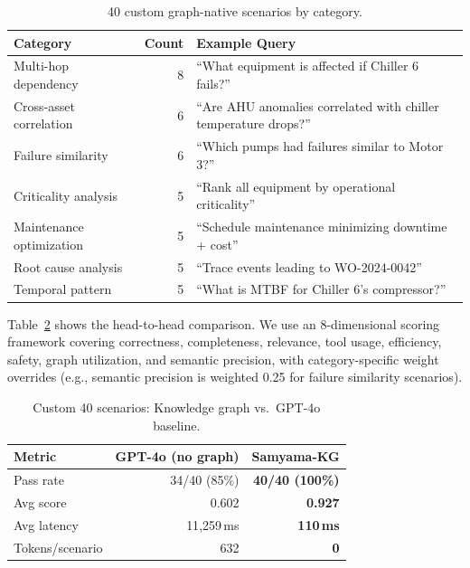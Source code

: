 \documentclass[11pt]{article}
\begin{document}
\begin{table}[t]
  \centering
  \caption{40 custom graph-native scenarios by category.}
  \label{tab:custom-categories}
  \begin{tabular}{@{}lrl@{}}
    \toprule
    \textbf{Category} & \textbf{Count} & \textbf{Example Query} \\
    \midrule
    Multi-hop dependency     & 8 & ``What equipment is affected if Chiller 6 fails?'' \\
    Cross-asset correlation  & 6 & ``Are AHU anomalies correlated with chiller temperature drops?'' \\
    Failure similarity       & 6 & ``Which pumps had failures similar to Motor 3?'' \\
    Criticality analysis     & 5 & ``Rank all equipment by operational criticality'' \\
    Maintenance optimization & 5 & ``Schedule maintenance minimizing downtime + cost'' \\
    Root cause analysis      & 5 & ``Trace events leading to WO-2024-0042'' \\
    Temporal pattern         & 5 & ``What is MTBF for Chiller 6's compressor?'' \\
    \bottomrule
  \end{tabular}
\end{table}

Table~\ref{tab:custom-results} shows the head-to-head comparison. We use an 8-dimensional scoring framework covering correctness, completeness, relevance, tool usage, efficiency, safety, graph utilization, and semantic precision, with category-specific weight overrides (e.g., semantic precision is weighted 0.25 for failure similarity scenarios).

\begin{table}[t]
  \centering
  \caption{Custom 40 scenarios: Knowledge graph vs.\ GPT-4o baseline.}
  \label{tab:custom-results}
  \begin{tabular}{@{}lrr@{}}
    \toprule
    \textbf{Metric} & \textbf{GPT-4o (no graph)} & \textbf{Samyama-KG} \\
    \midrule
    Pass rate        & 34/40 (85\%)   & \textbf{40/40 (100\%)} \\
    Avg score        & 0.602          & \textbf{0.927} \\
    Avg latency      & 11{,}259\,ms   & \textbf{110\,ms} \\
    Tokens/scenario  & 632            & \textbf{0} \\
    \bottomrule
  \end{tabular}
\end{table}
\end{document}
